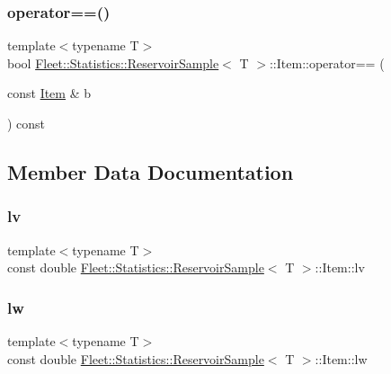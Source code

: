 \subsubsection{\texorpdfstring{operator==()}{operator==()}}
{\footnotesize\ttfamily template$<$typename T$>$ \\
bool \hyperlink{class_fleet_1_1_statistics_1_1_reservoir_sample}{Fleet\+::\+Statistics\+::\+Reservoir\+Sample}$<$ T $>$\+::Item\+::operator== (\begin{DoxyParamCaption}\item[{const \hyperlink{class_fleet_1_1_statistics_1_1_reservoir_sample_1_1_item}{Item} \&}]{b }\end{DoxyParamCaption}) const\hspace{0.3cm}{\ttfamily [inline]}}



\subsection{Member Data Documentation}
\mbox{\label{class_fleet_1_1_statistics_1_1_reservoir_sample_1_1_item_a0037b193d6712481b90416b51f2eb9d5}} 
\subsubsection{\texorpdfstring{lv}{lv}}
{\footnotesize\ttfamily template$<$typename T$>$ \\
const double \hyperlink{class_fleet_1_1_statistics_1_1_reservoir_sample}{Fleet\+::\+Statistics\+::\+Reservoir\+Sample}$<$ T $>$\+::Item\+::lv}

\mbox{\label{class_fleet_1_1_statistics_1_1_reservoir_sample_1_1_item_af6e0c0e3569786a8896fcd7ab758a587}} 
\subsubsection{\texorpdfstring{lw}{lw}}
{\footnotesize\ttfamily template$<$typename T$>$ \\
const double \hyperlink{class_fleet_1_1_statistics_1_1_reservoir_sample}{Fleet\+::\+Statistics\+::\+Reservoir\+Sample}$<$ T $>$\+::Item\+::lw}

